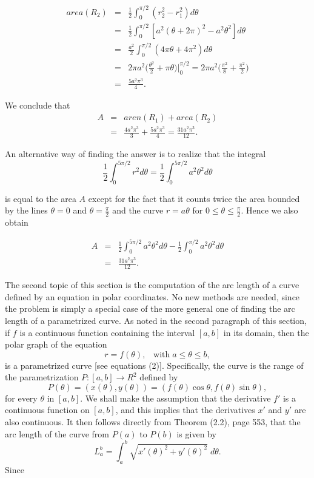\begin{example}
\begin{eqnarray*}
area(R_2) &=& \frac{1}{2} \int_0^{\pi/2} (r_2^2 - r_1^2) d\theta  \\
&=& \frac{1}{2} \int_0^{\pi/2} [a^2 (\theta + 2\pi)^2 - a^2 \theta^2] d\theta \\
&=& \frac{a^2}{2} \int_0^{\pi/2} (4 \pi \theta + 4\pi^2) d\theta \\
&=& 2\pi a^2 \Big(\frac{\theta^2}{2} + \pi \theta\Big) \Big|_0^{\pi/2} = 2\pi a^2 \Big(\frac{\pi^2}{8} + \frac{\pi^2}{2}\Big) \\
&=& \frac{5a^2 \pi^3}{4} .
\end{eqnarray*}

\noindent We conclude that
\begin{eqnarray*}
A &=& aren(R_1) + area(R_2)\\
    &=& \frac{4a^2 \pi^3}{3} + \frac{5a^2 \pi^3}{4} = \frac{31a^2 \pi^3}{12} .
\end{eqnarray*}

\noindent An alternative way of finding the answer is to realize that the integral 
$$
\frac{1}{2} \int_0^{5\pi/2} r^2 d\theta = \frac{1}{2} \int_0^{5\pi/2} a^2 \theta^2 d\theta
$$

\noindent is equal to the area $A$ except for the fact that it counts twice the area bounded by the lines $\theta = 0$ and $\theta = \frac{\pi}{2}$ and the curve $r = a\theta$ for $0 \leq \theta \leq \frac{\pi}{2}$. Hence we also obtain

\begin{eqnarray*}
A &=& \frac{1}{2} \int_0^{5\pi/2} a^2 \theta^2 d\theta - \frac{1}{2} \int_0^{\pi/2} a^2 \theta^2 d\theta \\
   &=& \frac{31a^2 \pi^3}{12} .
\end{eqnarray*}
\end{example}

The second topic of this section is the computation of the arc length of a curve defined by an equation in polar coordinates. No new methods are needed, since the problem is simply a special case of the more general one of finding the arc length of a parametrized curve. As noted in the second
paragraph of this section, if $f$ is a continuous function containing the interval $[a, b]$ in its domain, then the polar graph of the equation 
$$
r = f(\theta), \;\;\;\mbox{with}\; a \leq \theta \leq b,
$$
\noindent is a parametrized curve [see equations (2)]. Specifically, the curve is the range of the parametrization $P: [a, b] \rightarrow R^2$ defined by
$$
P(\theta) = (x(\theta), y(\theta)) = (f(\theta) \cos \theta, f(\theta) \sin \theta),
$$
\noindent for every $\theta$ in $[a, b]$. We shall make the assumption that the derivative $f'$ is a continuous function on $[a, b]$, and this implies that the derivatives $x'$ and $y'$ are also continuous. It then follows directly from Theorem (2.2), page 553, that the arc length of the curve from $P(a)$ to $P(b)$ is given by  
$$
L_a^b = \int_a^b \sqrt{x'(\theta)^2 + y'(\theta)^2} \;d\theta. 
$$
\noindent Since

